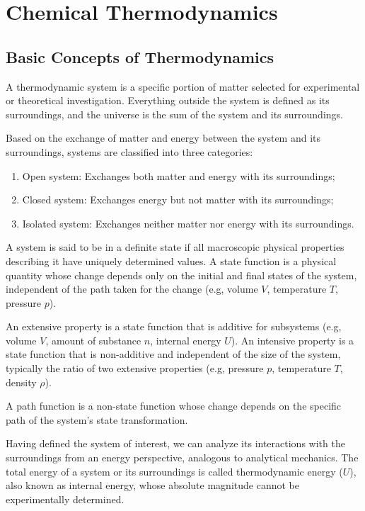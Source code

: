 \section{Chemical Thermodynamics}
\subsection{Basic Concepts of Thermodynamics}
\begin{definition}
A thermodynamic system is a specific portion of matter selected for experimental or theoretical investigation. Everything outside the system is defined as its surroundings, and the universe is the sum of the system and its surroundings.
\end{definition}

Based on the exchange of matter and energy between the system and its surroundings, systems are classified into three categories:
\begin{enumerate}
    \item Open system: Exchanges both matter and energy with its surroundings;
    \item Closed system: Exchanges energy but not matter with its surroundings;
    \item Isolated system: Exchanges neither matter nor energy with its surroundings.
\end{enumerate}

A system is said to be in a definite state if all macroscopic physical properties describing it have uniquely determined values. A state function is a physical quantity whose change depends only on the initial and final states of the system, independent of the path taken for the change (e.g, volume $V$, temperature $T$, pressure $p$).

An extensive property is a state function that is additive for subsystems (e.g, volume $V$, amount of substance $n$, internal energy $U$). An intensive property is a state function that is non-additive and independent of the size of the system, typically the ratio of two extensive properties (e.g, pressure $p$, temperature $T$, density $\rho$).

A path function is a non-state function whose change depends on the specific path of the system's state transformation.

Having defined the system of interest, we can analyze its interactions with the surroundings from an energy perspective, analogous to analytical mechanics. The total energy of a system or its surroundings is called thermodynamic energy ($U$), also known as internal energy, whose absolute magnitude cannot be experimentally determined.

